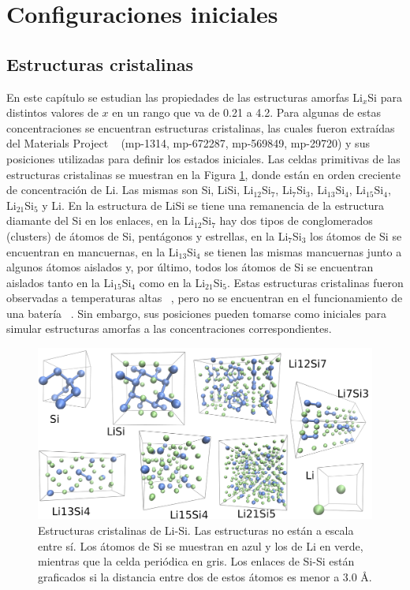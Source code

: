 \section{Configuraciones iniciales}

\subsection{Estructuras cristalinas}

En este capítulo se estudian las propiedades de las estructuras amorfas Li$_x$Si
para distintos valores de $x$ en un rango que va de 0.21 a 4.2. Para algunas de
estas concentraciones se encuentran estructuras cristalinas, las cuales 
fueron extraídas del Materials Project ~\cite{materials_project} 
(mp-1314, mp-672287, mp-569849, mp-29720) y sus posiciones utilizadas para definir
los estados iniciales. Las celdas primitivas de las estructuras cristalinas se
muestran en la Figura \ref{fig:cristalinas}, donde están en orden creciente de 
concentración de Li. Las mismas son Si, LiSi, Li$_{12}$Si$_7$, Li$_7$Si$_3$, 
Li$_{13}$Si$_4$, Li$_{15}$Si$_4$, Li$_{21}$Si$_5$ y Li. En la estructura de LiSi
se tiene una remanencia de la estructura diamante del Si en los enlaces, en la Li$_{12}$Si$_7$ 
hay dos tipos de conglomerados (clusters) de átomos de Si, pentágonos y estrellas, en la
Li$_7$Si$_3$ los átomos de Si se encuentran en mancuernas, en la Li$_{13}$Si$_4$ 
se tienen las mismas mancuernas junto a algunos átomos aislados y, por último, 
todos los átomos de Si se encuentran aislados tanto en la Li$_{15}$Si$_{4}$ como
en la Li$_{21}$Si$_5$. Estas estructuras cristalinas fueron observadas a 
temperaturas altas ~\cite{wen1981}, pero no se encuentran en el funcionamiento de
una batería ~\cite{obrovac2004}. Sin embargo, sus posiciones pueden tomarse como 
iniciales para simular estructuras amorfas a las concentraciones correspondientes.
\begin{figure}[h!]
    \centering
    \includegraphics[width=\textwidth]{Silicio/caracterizacion/config/cristalinas.png}
    \caption{Estructuras cristalinas de Li-Si. Las estructuras no están a escala 
    entre sí. Los átomos de Si se muestran en azul y los de Li en verde, mientras
    que la celda periódica en gris. Los enlaces de Si-Si están graficados si la 
    distancia entre dos de estos átomos es menor a 3.0 \AA.}
    \label{fig:cristalinas}
\end{figure}

